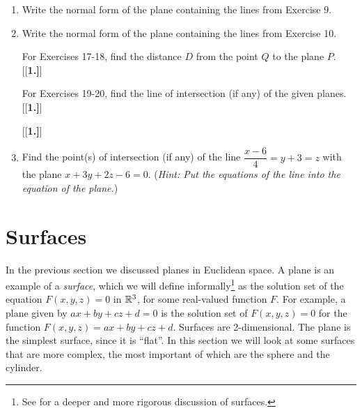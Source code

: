 \begin{enumerate}[\bfseries 1.]
\begin{multicols}{2}
 \end{multicols}
\par\noindent For Exercises 13-14, write the normal form of the plane containing the given points.
[{[\bfseries 1.]}]
 \item Write the normal form of the plane containing the lines from Exercise 9.
 \item Write the normal form of the plane containing the lines from Exercise 10.
\par\noindent For Exercises 17-18, find the distance $D$ from the point $Q$ to the plane $P$.
[{[\bfseries 1.]}]
\par\noindent For Exercises 19-20, find the line of intersection (if any) of the given planes.
[{[\bfseries 1.]}]
[{[\bfseries 1.]}]
 \item Find the point(s) of intersection (if any) of the line $\dfrac{x - 6}{4} = y + 3 = z$ with the plane
 $x + 3y + 2z - 6 = 0$. (\emph{Hint: Put the equations of the line into the equation of the plane.})
\end{enumerate}
\newpage
\section{Surfaces}
In the previous section we discussed planes in Euclidean space. A plane is an example of a \emph{surface}, which we
will define informally\footnote{See \cite{one} for a deeper and more rigorous discussion of surfaces.} as the
solution set of the equation $F(x,y,z) = 0$ in $\mathbb{R}^{3}$, for some real-valued function $F$. For example, a plane
given by $ax + by + cz + d = 0$ is the solution set of $F(x,y,z) = 0$ for the function $F(x,y,z) = ax + by + cz + d$.
Surfaces are 2-dimensional. The plane is the simplest surface, since it is ``flat''. In this
section we will look at some surfaces that are more complex, the most important of which are the sphere and the
cylinder.

